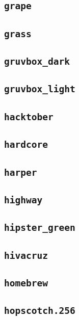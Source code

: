 \subsection{\texttt{grape}}
\newpage
\subsection{\texttt{grass}}
\newpage
\subsection{\texttt{gruvbox\_dark}}
\newpage
\subsection{\texttt{gruvbox\_light}}
\newpage
\subsection{\texttt{hacktober}}
\newpage
\subsection{\texttt{hardcore}}
\newpage
\subsection{\texttt{harper}}
\newpage
\subsection{\texttt{highway}}
\newpage
\subsection{\texttt{hipster\_green}}
\newpage
\subsection{\texttt{hivacruz}}
\newpage
\subsection{\texttt{homebrew}}
\newpage
\subsection{\texttt{hopscotch.256}}
\newpage
